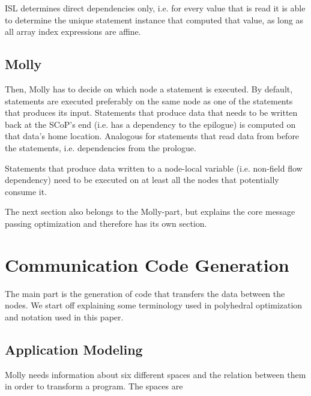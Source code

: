 \documentclass{sigplanconf}
\begin{document}
ISL determines direct dependencies only, i.e. for every value that is read it is able to determine the unique statement instance that computed that value, as long as all array index expressions are affine.


\subsection{Molly}

Then, Molly has to decide on which node a statement is executed. By default, statements are executed preferably on the same node as one of the statements that produces its input. Statements that produce data that needs to be written back at the SCoP's end (i.e. has a dependency to the epilogue) is computed on that data's home location. Analogous for statements that read data from before the statements, i.e. dependencies from the prologue.

Statements that produce data written to a node-local variable (i.e. non-field flow dependency) need to be executed on at least all the nodes that potentially consume it. 

The next section also belongs to the Molly-part, but explains the core message passing optimization and therefore has its own section. 


\section{Communication Code Generation}\label{sct:communication}

The main part is the generation of code that transfers the data between the nodes. We start off explaining some terminology used in polyhedral optimization and notation used in this paper.



\subsection{Application Modeling}

Molly needs information about six different spaces and the relation between them in order to transform a program. The spaces are
\end{document}
